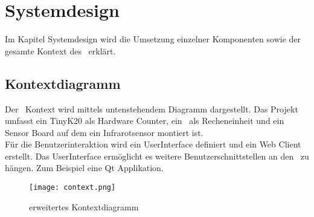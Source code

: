 \section{Systemdesign}
    Im Kapitel Systemdesign wird die Umsetzung einzelner Komponenten sowie der gesamte Kontext des \documenttitle\ erklärt.
        \subsection{Kontextdiagramm}
        Der \documenttitle\ Kontext wird mittels untenstehendem Diagramm dargestellt. Das Projekt umfasst ein TinyK20 als Hardware Counter, ein \rpi\ als Recheneinheit und ein Sensor Board auf dem ein Infrarotsensor montiert ist.\\
        Für die Benutzerinteraktion wird ein UserInterface definiert und ein Web Client erstellt. Das UserInterface ermöglicht es weitere Benutzerschnittstellen an den \documenttitle\ zu hängen. Zum Beispiel eine Qt Applikation.
        \begin{figure}[H]
            \centering
            \texttt{[image: context.png]}
            \caption{erweitertes Kontextdiagramm}
            \label{fig:kontext}
        \end{figure}


        \clearpage
        
        
        \clearpage
		
        \clearpage
		
        \clearpage
        
        \clearpage
        
        \clearpage
        
        \clearpage
		